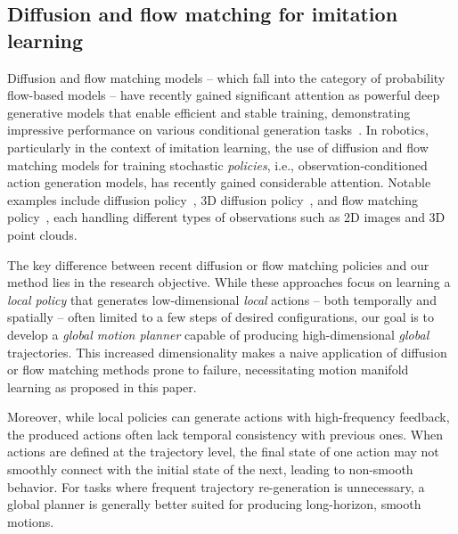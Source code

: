 \subsection{Diffusion and flow matching for imitation learning}
Diffusion and flow matching models -- which fall into the category of probability flow-based models -- have recently gained significant attention as powerful deep generative models that enable efficient and stable training, demonstrating impressive performance on various conditional generation tasks~\cite{song2020denoising, song2020score, ho2022classifier, lipman2022flow, chen2023riemannian, tong2023conditional, lipman2024flow}. 
In robotics, particularly in the context of imitation learning, the use of diffusion and flow matching models for training stochastic {\it policies}, i.e., observation-conditioned action generation models, has recently gained considerable attention. Notable examples include diffusion policy~\cite{chi2023diffusion}, 3D diffusion policy~\cite{ze20243d}, and flow matching policy~\cite{chisari2024learning}, each handling different types of observations such as 2D images and 3D point clouds.

The key difference between recent diffusion or flow matching policies and our method lies in the research objective. While these approaches focus on learning a {\it local policy} that generates low-dimensional {\it local} actions -- both temporally and spatially -- often limited to a few steps of desired configurations, our goal is to develop a {\it global motion planner} capable of producing high-dimensional {\it global} trajectories. This increased dimensionality makes a naive application of diffusion or flow matching methods prone to failure, necessitating motion manifold learning as proposed in this paper. 

Moreover, while local policies can generate actions with high-frequency feedback, the produced actions often lack temporal consistency with previous ones. When actions are defined at the trajectory level, the final state of one action may not smoothly connect with the initial state of the next, leading to non-smooth behavior. For tasks where frequent trajectory re-generation is unnecessary, a global planner is generally better suited for producing long-horizon, smooth motions.